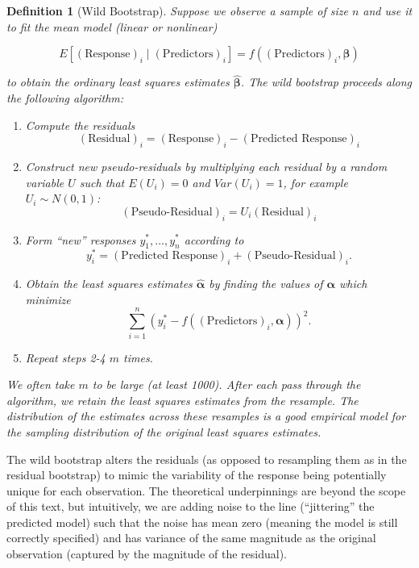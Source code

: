 \documentclass[
]{book}
\providecommand{\tightlist}{%
  \setlength{\itemsep}{0pt}\setlength{\parskip}{0pt}}
\theoremstyle{plain}
\theoremstyle{mydefn}
\newtheorem{definition}{Definition}[chapter]
\theoremstyle{myexmpl}
\theoremstyle{remark}
\begin{document}
\begin{definition}[Wild Bootstrap]
Suppose we observe a sample of size \(n\) and use it to fit the mean model (linear or nonlinear)

\[E\left[(\text{Response})_i \mid (\text{Predictors})_i\right]= f\left((\text{Predictors})_i, \boldsymbol{\beta}\right)\]

to obtain the ordinary least squares estimates \(\widehat{\boldsymbol{\beta}}\). The wild bootstrap proceeds along the following algorithm:

\begin{enumerate}
\def\labelenumi{\arabic{enumi}.}
\tightlist
\item
  Compute the residuals
  \[(\text{Residual})_i = (\text{Response})_i - (\text{Predicted Response})_i\]
\item
  Construct new pseudo-residuals by multiplying each residual by a random variable \(U\) such that \(E\left(U_i\right) = 0\) and \(Var\left(U_i\right) = 1\), for example \(U_i \sim N(0,1)\):
  \[(\text{Pseudo-Residual})_i = U_i (\text{Residual})_i\]
\item
  Form ``new'' responses \(y_1^*, \dotsc, y_n^*\) according to
  \[y_i^* = (\text{Predicted Response})_i + (\text{Pseudo-Residual})_i.\]
\item
  Obtain the least squares estimates \(\widehat{\boldsymbol{\alpha}}\) by finding the values of \(\boldsymbol{\alpha}\) which minimize
  \[\sum_{i=1}^{n} \left(y_i^* - f\left((\text{Predictors})_i, \boldsymbol{\alpha}\right)\right)^2.\]
\item
  Repeat steps 2-4 \(m\) times.
\end{enumerate}

We often take \(m\) to be large (at least 1000). After each pass through the algorithm, we retain the least squares estimates from the resample. The distribution of the estimates across these resamples is a good empirical model for the sampling distribution of the original least squares estimates.
\end{definition}

The wild bootstrap alters the residuals (as opposed to resampling them as in the residual bootstrap) to mimic the variability of the response being potentially unique for each observation. The theoretical underpinnings are beyond the scope of this text, but intuitively, we are adding noise to the line (``jittering'' the predicted model) such that the noise has mean zero (meaning the model is still correctly specified) and has variance of the same magnitude as the original observation (captured by the magnitude of the residual).
\end{document}
